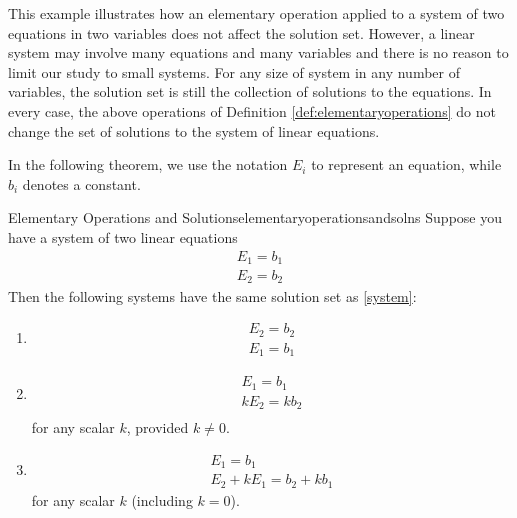 This example illustrates how an elementary operation applied to a system of two equations in two variables
does not affect the solution set. However, a linear system may involve many equations and many variables and there is no 
reason to limit our study to small systems. For any size of system in any number of variables, the
solution set is still the collection of solutions to the equations. In every
case, the above operations of Definition \ref{def:elementaryoperations} do not
change the set of solutions to the system of linear equations.

In the following theorem, we use the notation $E_i$ to represent an equation, while $b_i$ denotes a
constant. 

\begin{theorem}{Elementary Operations and Solutions}{elementaryoperationsandsolns}
Suppose you have a system of two linear equations 
\begin{equation}
 \begin{array}{c}
  E_{1}=b_{1}\\
  E_{2}=b_{2}
\end{array} \label{system}
\end{equation}
Then the following systems have the same solution set as \ref{system}: 
\begin{enumerate}
\item   \begin{equation}
	\begin{array}{c}
	E_{2}=b_{2}\\
	E_{1}=b_{1}
	\end{array}
	\label{thm1.9.1}
	\end{equation}
\item  \begin{equation}
	\begin{array}{c}
	E_{1}=b_{1} \\
	kE_{2}=kb_{2}\\        
	\end{array}
	\label{thm1.9.2}
	\end{equation}
  for any scalar $k$, provided $k\neq0$.
\item \begin{equation}
      \begin{array}{c}
       E_{1}=b_{1} \\
       E_{2}+kE_{1}=b_{2}+kb_{1}
       \end{array}  
	\label{thm1.9.3}
	\end{equation}
	for any scalar  $k$ (including $k=0$).

\end{enumerate}
\end{theorem}

